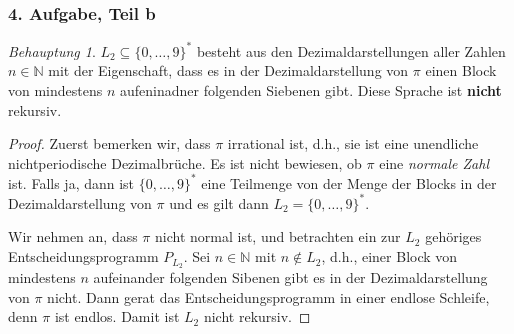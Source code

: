 \documentclass[draft,a4paper]{article}
\theoremstyle{remark}
\newtheorem*{beh}{Behauptung}
\begin{document}
\subsubsection*{4. Aufgabe, Teil b}
\begin{beh}
  \(L_{2} \subseteq \{0, \ldots, 9\}^{*}\) besteht aus den Dezimaldarstellungen
  aller Zahlen \(n \in \mathbb{N}\) mit der Eigenschaft, dass es in der
  Dezimaldarstellung von \(\pi\) einen Block von mindestens \(n\)
  aufeninadner folgenden Siebenen gibt.  Diese Sprache ist
  \textbf{nicht} rekursiv.
\end{beh}
\begin{proof}
  Zuerst bemerken wir, dass \(\pi\) irrational ist, d.h., sie ist eine
  unendliche nichtperiodische Dezimalbrüche.  Es ist nicht bewiesen,
  ob \(\pi\) eine \textit{normale Zahl} ist.  Falls ja, dann ist
  \(\{0, \ldots, 9\}^{*}\) eine Teilmenge von der Menge der Blocks in der
  Dezimaldarstellung von \(\pi\) und es gilt dann
  \(L_{2} = \{0, \ldots, 9\}^{*}\).

  Wir nehmen an, dass \(\pi\) nicht normal ist, und betrachten ein zur
  \(L_{2}\) gehöriges Entscheidungsprogramm \(P_{L_{2}}\).  Sei
  \(n \in \mathbb{N}\) mit \(n \notin L_{2}\), d.h., einer Block von mindestens
  \(n\) aufeinander folgenden Sibenen gibt es in der
  Dezimaldarstellung von \(\pi\) nicht.  Dann gerat das
  Entscheidungsprogramm in einer endlose Schleife, denn \(\pi\) ist
  endlos.  Damit ist \(L_{2}\) nicht rekursiv.
\end{proof}
\end{document}
